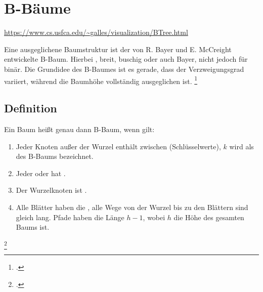 \documentclass{lehramt-informatik-haupt}
\begin{document}

\chapter{B-Bäume}

\begin{liQuellen}
\item \cite{wiki:bbaum}
\item \cite[Kapitel 14.4.3, Seite 386-399 (PDF 402-415)]{saake}
\item \cite[Kapitel 13.5.4.2 Balancierte Mehrwegbäume, Seite 464, wird
nur erwähnt, nicht beschrieben]{schneider}
\item \cite[7.8 B-Bäume Seite 224-228]{kemper}
\end{liQuellen}

\url{https://www.cs.usfca.edu/~galles/visualization/BTree.html}

\noindent
Eine ausgeglichene Baumstruktur ist der von R. Bayer und E. McCreight
entwickelte B-Baum. Hierbei ,
breit, buschig oder auch Bayer, nicht jedoch für binär. Die Grundidee
des B-Baumes ist es gerade, dass der Verzweigungsgrad variiert, während
die Baumhöhe vollständig ausgeglichen ist.
\footcite[Seite 386]{saake}

%

\section{Definition}

Ein Baum heißt genau dann B-Baum, wenn gilt:
%

\begin{enumerate}
\item Jeder Knoten außer der Wurzel enthält zwischen  (Schlüsselwerte), $k$ wird als  des B-Baums
bezeichnet.
%
\item Jeder  oder hat
.
%
\item Der Wurzelknoten ist .
%
\item Alle Blätter haben die , \dh alle Wege von
der Wurzel bis zu den Blättern sind gleich lang. Pfade haben die Länge
$h - 1$, wobei $h$ die Höhe des gesamten Baums ist.
\end{enumerate}
\footcite[Seite 32]{aud:fs:5}
\end{document}
